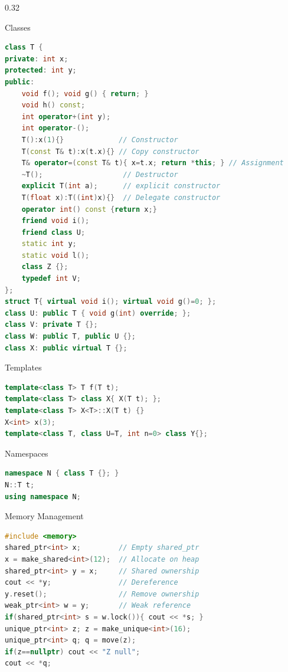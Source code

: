\documentclass[final]{beamer}
\begin{document}
\begin{frame}[t,fragile]
\begin{columns}[t,totalwidth=\paperwidth, colsep=0.015\paperwidth]
\begin{column}{0.32\paperwidth}
\begin{block}{Classes}
\begin{lstlisting}[language=C++]
class T {
private: int x;
protected: int y;
public:
    void f(); void g() { return; }
    void h() const;
    int operator+(int y);
    int operator-();
    T():x(1){}             // Constructor
    T(const T& t):x(t.x){} // Copy constructor
    T& operator=(const T& t){ x=t.x; return *this; } // Assignment
    ~T();                   // Destructor
    explicit T(int a);      // explicit constructor
    T(float x):T((int)x){}  // Delegate constructor
    operator int() const {return x;}
    friend void i();
    friend class U;
    static int y; 
    static void l();
    class Z {}; 
    typedef int V;
};
struct T{ virtual void i(); virtual void g()=0; }; 
class U: public T { void g(int) override; };
class V: private T {};
class W: public T, public U {};
class X: public virtual T {};
\end{lstlisting}
\end{block}

\begin{block}{Templates}
\begin{lstlisting}[language=C++]
template<class T> T f(T t);
template<class T> class X{ X(T t); };
template<class T> X<T>::X(T t) {}
X<int> x(3);
template<class T, class U=T, int n=0> class Y{};
\end{lstlisting}
\end{block}

\begin{block}{Namespaces}
\begin{lstlisting}[language=C++]
namespace N { class T {}; }
N::T t;
using namespace N;
\end{lstlisting}
\end{block}

\begin{block}{Memory Management}
\begin{lstlisting}[language=C++]
#include <memory>
shared_ptr<int> x;         // Empty shared_ptr
x = make_shared<int>(12);  // Allocate on heap
shared_ptr<int> y = x;     // Shared ownership
cout << *y;                // Dereference
y.reset();                 // Remove ownership
weak_ptr<int> w = y;       // Weak reference
if(shared_ptr<int> s = w.lock()){ cout << *s; }
unique_ptr<int> z; z = make_unique<int>(16);
unique_ptr<int> q; q = move(z);
if(z==nullptr) cout << "Z null";
cout << *q;
\end{lstlisting}
\end{block}


\end{column}
\end{columns}
\end{frame}
\end{document}
